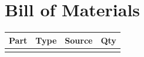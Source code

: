 \chapter{Bill of Materials}
\label{app:bom}

\begin{tabular}{@{}lllr@{}}
  \toprule
  Part & Type & Source & Qty \\
  \midrule
       &      &        &     \\
  \bottomrule
\end{tabular}
